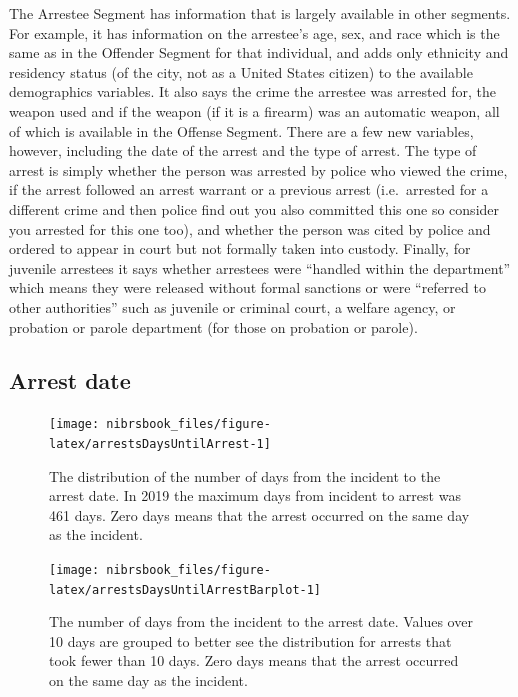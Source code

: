 \documentclass[
  12pt,
  openany]{book}
\begin{document}
The Arrestee Segment has information that is largely available in other segments. For example, it has information on the arrestee's age, sex, and race which is the same as in the Offender Segment for that individual, and adds only ethnicity and residency status (of the city, not as a United States citizen) to the available demographics variables. It also says the crime the arrestee was arrested for, the weapon used and if the weapon (if it is a firearm) was an automatic weapon, all of which is available in the Offense Segment. There are a few new variables, however, including the date of the arrest and the type of arrest. The type of arrest is simply whether the person was arrested by police who viewed the crime, if the arrest followed an arrest warrant or a previous arrest (i.e.~arrested for a different crime and then police find out you also committed this one so consider you arrested for this one too), and whether the person was cited by police and ordered to appear in court but not formally taken into custody. Finally, for juvenile arrestees it says whether arrestees were ``handled within the department'' which means they were released without formal sanctions or were ``referred to other authorities'' such as juvenile or criminal court, a welfare agency, or probation or parole department (for those on probation or parole).

\hypertarget{arrest-date}{%
\subsection{Arrest date}\label{arrest-date}}

\begin{figure}

{\centering \texttt{[image: nibrsbook\_files/figure-latex/arrestsDaysUntilArrest-1]} 

}

\caption{The distribution of the number of days from the incident to the arrest date. In 2019 the maximum days from incident to arrest was 461 days. Zero days means that the arrest occurred on the same day as the incident.}\label{fig:arrestsDaysUntilArrest}
\end{figure}

\begin{figure}

{\centering \texttt{[image: nibrsbook\_files/figure-latex/arrestsDaysUntilArrestBarplot-1]} 

}

\caption{The number of days from the incident to the arrest date. Values over 10 days are grouped to better see the distribution for arrests that took fewer than 10 days. Zero days means that the arrest occurred on the same day as the incident.}\label{fig:arrestsDaysUntilArrestBarplot}
\end{figure}
\end{document}
